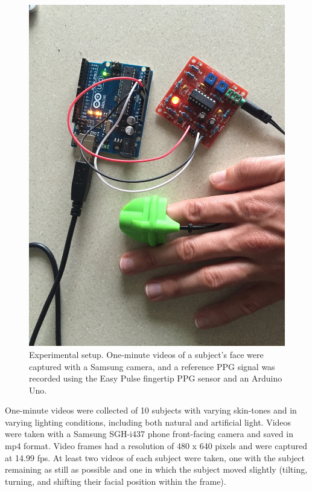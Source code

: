 \documentclass[10pt,twocolumn,letterpaper]{article}
\begin{document}
\begin{figure}
\begin{center}
	\includegraphics[scale=0.045]{figures/ref_setup}
\end{center}
\caption{Experimental setup. One-minute videos of a subject's face were captured with a Samsung camera, and a reference PPG signal was recorded using the Easy Pulse fingertip PPG sensor and an Arduino Uno.}
\label{face_bb}
\end{figure}

One-minute videos were collected of 10 subjects with varying skin-tones and in varying lighting conditions, including both natural and artificial light. Videos were taken with a Samsung SGH-i437 phone front-facing camera and saved in mp4 format. Video frames had a resolution of 480 x 640 pixels and were captured at 14.99 fps. At least two videos of each subject were taken, one with the subject remaining as still as possible and one in which the subject moved slightly (tilting, turning, and shifting their facial position within the frame). 
\end{document}
